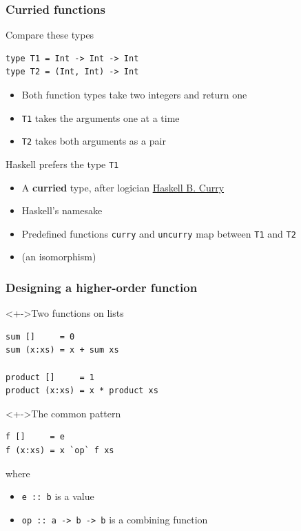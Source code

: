 \documentclass{beamer}
\begin{document}
\begin{frame}[fragile]
  \frametitle{Curried functions}

\begin{block}{Compare these types}
\begin{verbatim}
type T1 = Int -> Int -> Int
type T2 = (Int, Int) -> Int
\end{verbatim}
\begin{itemize}
\item Both function types take two integers and return one
\item \texttt{T1} takes the arguments one at a time
\item \texttt{T2} takes both arguments as a pair
\end{itemize}
\end{block}
\begin{block}{Haskell prefers the type  \texttt{T1}}
  \begin{itemize}
  \item A \textbf{curried} type, after logician \href{https://en.wikipedia.org/wiki/Haskell_Curry}{Haskell B. Curry}
  \item Haskell's namesake
  \item Predefined functions \texttt{curry} and \texttt{uncurry} map between \texttt{T1} and \texttt{T2}
  \item (an isomorphism)
  \end{itemize}
\end{block}
\end{frame}
\begin{frame}[fragile]
  \frametitle{Designing a higher-order function}
  \begin{block}<+->{Two functions on lists}
\begin{verbatim}
sum []     = 0
sum (x:xs) = x + sum xs

product []     = 1
product (x:xs) = x * product xs
\end{verbatim}
  \end{block}
  \begin{block}<+->{The common pattern}
\begin{verbatim}
f []     = e
f (x:xs) = x `op` f xs
\end{verbatim}
    where
    \begin{itemize}
    \item \texttt{e :: b} is a value
    \item \texttt{op :: a -> b -> b} is a combining function
    \end{itemize}
  \end{block}
\end{frame}
\end{document}
